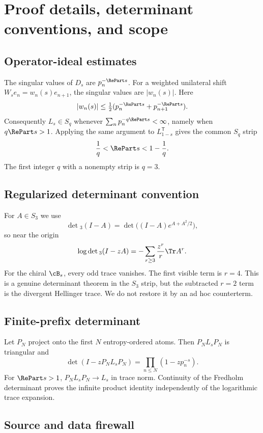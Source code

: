 \section{Proof details, determinant conventions, and scope}
\label{app:proofs}

\subsection{Operator-ideal estimates}

The singular values of $D_s$ are $p_n^{-\RePart s}$.  For a weighted
unilateral shift $W_se_n=w_n(s)e_{n+1}$, the singular values are
$|w_n(s)|$.  Here
\[
 |w_n(s)|\le\tfrac12
 (p_n^{-\RePart s}+p_{n+1}^{-\RePart s}).
\]
Consequently $L_s\in S_q$ whenever
$\sum_np_n^{-q\RePart s}<\infty$, namely when $q\RePart s>1$.  Applying the
same argument to $L_{1-s}^{\mathsf T}$ gives the common $S_q$ strip
\[
 \frac1q<\RePart s<1-\frac1q.
\]
The first integer $q$ with a nonempty strip is $q=3$.

\subsection{Regularized determinant convention}

For $A\in S_3$ we use
\[
 \det{}_3(I-A)
 =\det\bigl((I-A)e^{A+A^2/2}\bigr),
\]
so near the origin
\[
 \log\det{}_3(I-zA)
 =-\sum_{r\ge3}\frac{z^r}{r}\Tr A^r.
\]
For the chiral $\cB_s$, every odd trace vanishes.  The first visible term is
$r=4$.  This is a genuine determinant theorem in the $S_3$ strip, but the
subtracted $r=2$ term is the divergent Hellinger trace.  We do not restore it
by an ad hoc counterterm.

\subsection{Finite-prefix determinant}

Let $P_N$ project onto the first $N$ entropy-ordered atoms.  Then
$P_NL_sP_N$ is triangular and
\[
 \det(I-zP_NL_sP_N)=\prod_{n\le N}(1-zp_n^{-s}).
\]
For $\RePart s>1$, $P_NL_sP_N\to L_s$ in trace norm.  Continuity of the
Fredholm determinant proves the infinite product identity independently of
the logarithmic trace expansion.

\subsection{Source and data firewall}

